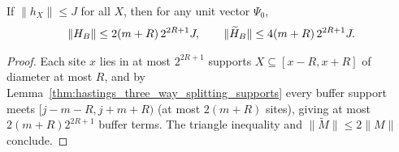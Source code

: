 \begin{lemma}
    \label{thm:hastings_three_way_splitting_norm}
    \leanok
    If $\|h_X\|\le J$ for all $X$, then for any unit vector $\Psi_0$,
    \begin{align}
        \|H_B\|\le2(m+R)\,2^{2R+1}J,\qquad
        \|\widetilde H_B\|\le4(m+R)\,2^{2R+1}J.
        \notag
    \end{align}
\end{lemma}
\begin{proof}\leanok
    Each site $x$ lies in at most $2^{2R+1}$ supports $X\subseteq[x-R,x+R]$ of
    diameter at most $R$, and by Lemma~\ref{thm:hastings_three_way_splitting_supports}
    every buffer support meets $[j-m-R,j+m+R)$ (at most $2(m+R)$ sites), giving
    at most $2(m+R)2^{2R+1}$ buffer terms. The triangle inequality and
    $\|\widetilde M\|\le 2\|M\|$ conclude.
\end{proof}
